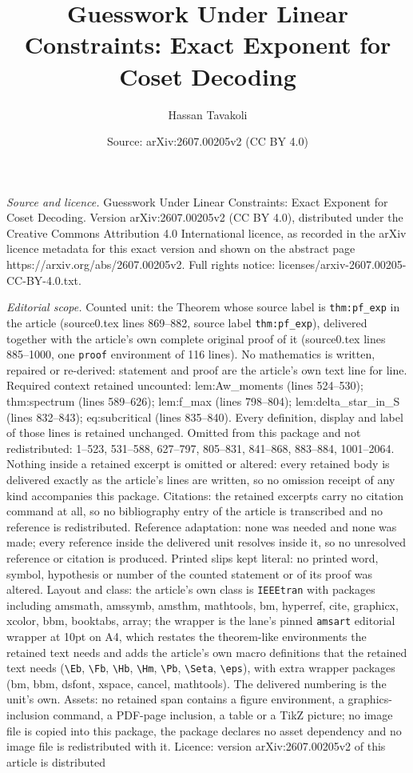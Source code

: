 \documentclass[10pt,a4paper]{amsart}
\title[Guesswork Under Linear Constraints: Exact Exponent for Coset]{Guesswork Under Linear Constraints: Exact Exponent for Coset Decoding}
\author{Hassan Tavakoli}
\date{Source: arXiv:2607.00205v2 (CC BY 4.0)}
\begin{document}
\maketitle

\noindent\emph{Source and licence.} Guesswork Under Linear Constraints: Exact Exponent for Coset Decoding. Version arXiv:2607.00205v2 (CC BY 4.0), distributed under the Creative Commons Attribution 4.0 International licence, as recorded in the arXiv licence metadata for this exact version and shown on the abstract page https://arxiv.org/abs/2607.00205v2. Full rights notice: licenses/arxiv-2607.00205-CC-BY-4.0.txt.\par\smallskip

\noindent\textit{Editorial scope.} Counted unit: the Theorem whose source label is \texttt{thm:pf\_exp} in the article (source0.tex lines 869--882, source label \texttt{thm:pf\_exp}), delivered together with the article's own complete original proof of it (source0.tex lines 885--1000, one \texttt{proof} environment of 116 lines). No mathematics is written, repaired or re-derived: statement and proof are the article's own text line for line. Required context retained uncounted: lem:Aw\_moments (lines 524--530); thm:spectrum (lines 589--626); lem:f\_max (lines 798--804); lem:delta\_star\_in\_S (lines 832--843); eq:subcritical (lines 835--840). Every definition, display and label of those lines is retained unchanged. Omitted from this package and not redistributed: 1--523, 531--588, 627--797, 805--831, 841--868, 883--884, 1001--2064. Nothing inside a retained excerpt is omitted or altered: every retained body is delivered exactly as the article's lines are written, so no omission receipt of any kind accompanies this package. Citations: the retained excerpts carry no citation command at all, so no bibliography entry of the article is transcribed and no reference is redistributed. Reference adaptation: none was needed and none was made; every reference inside the delivered unit resolves inside it, so no unresolved reference or citation is produced. Printed slips kept literal: no printed word, symbol, hypothesis or number of the counted statement or of its proof was altered. Layout and class: the article's own class is \texttt{IEEEtran} with packages including amsmath, amssymb, amsthm, mathtools, bm, hyperref, cite, graphicx, xcolor, bbm, booktabs, array; the wrapper is the lane's pinned \texttt{amsart} editorial wrapper at 10pt on A4, which restates the theorem-like environments the retained text needs and adds the article's own macro definitions that the retained text needs (\texttt{\textbackslash Eb}, \texttt{\textbackslash Fb}, \texttt{\textbackslash Hb}, \texttt{\textbackslash Hm}, \texttt{\textbackslash Pb}, \texttt{\textbackslash Seta}, \texttt{\textbackslash eps}), with extra wrapper packages (bm, bbm, dsfont, xspace, cancel, mathtools). The delivered numbering is the unit's own. Assets: no retained span contains a figure environment, a graphics-inclusion command, a PDF-page inclusion, a table or a TikZ picture; no image file is copied into this package, the package declares no asset dependency and no image file is redistributed with it. Licence: version arXiv:2607.00205v2 of this article is distributed 
\end{document}
